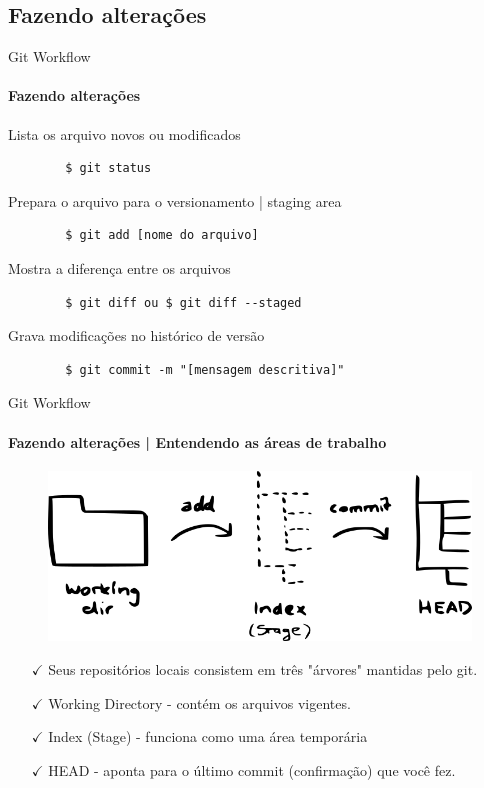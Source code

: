 \documentclass[xcolor=dvipsnames,t]{beamer}
\begin{document}
\subsection{Fazendo alterações}
\begin{frame}[fragile]{Git Workflow}
\framesubtitle{Fazendo alterações}
	\begin{block}{Lista os arquivo novos ou modificados}		
		\begin{verbatim}
		$ git status
		\end{verbatim}
	\end{block}			

	\begin{block}{Prepara o arquivo para o versionamento | staging area}		
		\begin{verbatim}
		$ git add [nome do arquivo]
		\end{verbatim}
	\end{block}
	
	\begin{block}{Mostra a diferença entre os arquivos}		
		\begin{verbatim}
		$ git diff ou $ git diff --staged		
		\end{verbatim}
	\end{block}		

		\begin{block}{Grava modificações no histórico de versão}		
		\begin{verbatim}
		$ git commit -m "[mensagem descritiva]"
		\end{verbatim}
	\end{block}		
			
\end{frame}

\begin{frame}[fragile]{Git Workflow}
\framesubtitle{Fazendo alterações | Entendendo as áreas de trabalho}

	\begin{figure}
		\centering			
		\includegraphics[width=0.6\linewidth]{figures/treesv2}
\end{figure}	
	\begin{itemize}		
		\small
	\item[$\checkmark$] Seus repositórios locais consistem em três "árvores" mantidas pelo git. 
	\item[$\checkmark$] Working Directory - contém os arquivos vigentes.
	\item[$\checkmark$] Index (Stage) - funciona como uma área temporária
	\item[$\checkmark$] HEAD - aponta para o último commit (confirmação) que você fez. 
\end{itemize}

\end{frame}
\end{document}
